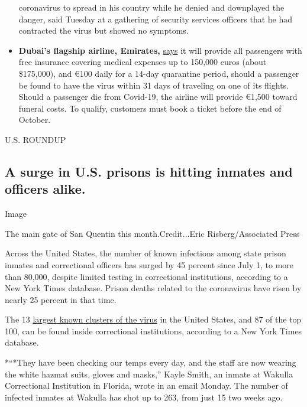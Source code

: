 \begin{itemize}
  coronavirus to spread in his country while he denied and downplayed
  the danger, said Tuesday at a gathering of security services officers
  that he had contracted the virus but showed no symptoms.
\item
  \textbf{Dubai's flagship airline, Emirates,}
  \href{https://www.emirates.com/media-centre/emirates-covers-customers-from-covid-19-expenses-in-industry-leading-initiative-to-boost-travel-confidence/}{says}
  it will provide all passengers with free insurance covering medical
  expenses up to 150,000 euros (about \$175,000), and €100 daily for a
  14-day quarantine period, should a passenger be found to have the
  virus within 31 days of traveling on one of its flights. Should a
  passenger die from Covid-19, the airline will provide €1,500 toward
  funeral costs. To qualify, customers must book a ticket before the end
  of October.
\end{itemize}

U.S. ROUNDUP

\hypertarget{a-surge-in-us-prisons-is-hitting-inmates-and-officers-alike-}{%
\subsection{A surge in U.S. prisons is hitting inmates and officers
alike.
}\label{a-surge-in-us-prisons-is-hitting-inmates-and-officers-alike-}}

Image

The main gate of San Quentin this month.Credit...Eric Risberg/Associated
Press

Across the United States, the number of known infections among state
prison inmates and correctional officers has surged by 45 percent since
July 1, to more than 80,000, despite limited testing in correctional
institutions, according to a New York Times database. Prison deaths
related to the coronavirus have risen by nearly 25 percent in that time.

The 13
\href{https://www.nytimes3xbfgragh.onion/interactive/2020/us/coronavirus-us-cases.html\#clusters}{largest
known clusters of the virus} in the United States, and 87 of the top
100, can be found inside correctional institutions, according to a New
York Times database.

*``*They have been checking our temps every day, and the staff are now
wearing the white hazmat suits, gloves and masks,'' Kayle Smith, an
inmate at Wakulla Correctional Institution in Florida, wrote in an email
Monday. The number of infected inmates at Wakulla has shot up to 263,
from just 15 two weeks ago.

